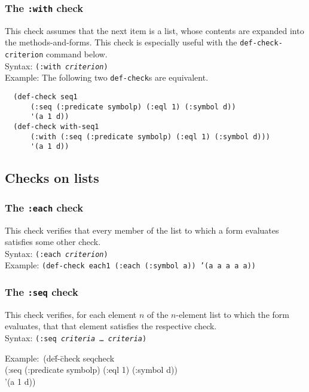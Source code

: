 \subsubsection{The \texttt{:with} check}
\par
This check assumes that the next item is a list, whose contents are
expanded into the methods-and-forms. This
check is especially useful with the \texttt{def-check-cri\-ter\-ion}
command below.
\\ Syntax: \texttt{(:with \emph{criterion})}
\\ Example: The following two \texttt{def-check}s are equivalent.
\begin{verbatim}
  (def-check seq1
      (:seq (:predicate symbolp) (:eql 1) (:symbol d))
      '(a 1 d))
  (def-check with-seq1
      (:with (:seq (:predicate symbolp) (:eql 1) (:symbol d)))
      '(a 1 d))
\end{verbatim}

\subsection{Checks on lists}

\subsubsection{The \texttt{:each} check}
This check verifies that every member of the list to which a form
evaluates satisfies some other check.
\\ Syntax: \texttt{(:each \emph{criterion})}
\\ Example: \texttt{(def-check each1 (:each (:symbol a)) '(a a a a a))}

\subsubsection{The \texttt{:seq} check}
This check verifies, for each element $n$ of the $n$-element list to
which the form evaluates, that that element satisfies the respective
check.
\\ Syntax: \texttt{(:seq \emph{criteria} \ldots\ \emph{criteria})}
{\ttfamily\begin{tabbing}
\textrm{Example:}\ (de\=f-\=check seqcheck
\\ \>\>  (:seq (:predicate symbolp) (:eql 1) (:symbol d))
\\ \>  '(a 1 d))
\end{tabbing}}

